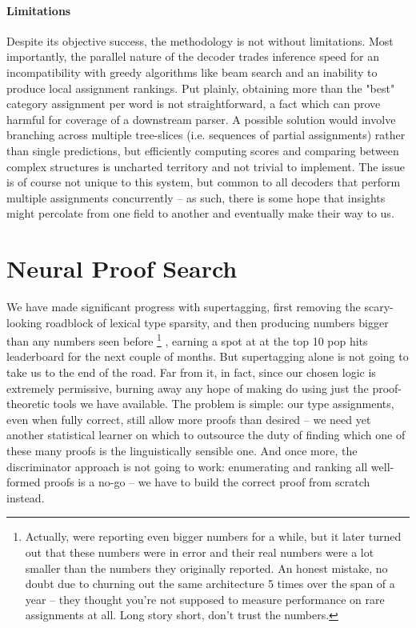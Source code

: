 \paragraph{Limitations}
Despite its objective success, the methodology is not without limitations.
Most importantly, the parallel nature of the decoder trades inference speed for an incompatibility with greedy algorithms like beam search and an inability to produce local assignment rankings.
Put plainly, obtaining more than the "best" category assignment per word is not straightforward, a fact which can prove harmful for coverage of a downstream parser.
A possible solution would involve branching across multiple tree-slices (i.e. sequences of partial assignments) rather than single predictions, but efficiently computing scores and comparing between complex structures is uncharted territory and not trivial to implement.
The issue is of course not unique to this system, but common to all decoders that perform multiple assignments concurrently -- as such, there is some hope that insights might percolate from one field to another and eventually make their way to us.

\section{Neural Proof Search}
\label{section:npn}
We have made significant progress with supertagging, first removing the scary-looking roadblock of lexical type sparsity, and then producing numbers bigger than any numbers seen before%
	\footnote{Actually, \citet{tian2020supertagging} were reporting even bigger numbers for a while, but it later turned out that these numbers were in error and their real numbers were a lot smaller than the numbers they originally reported.
	An honest mistake, no doubt due to churning out the same architecture 5 times over the span of a year -- they thought you're not supposed to measure performance on rare assignments at all.
	Long story short, don't trust the numbers.}%
, earning a spot at at the top 10 pop hits leaderboard for the next couple of months.
But supertagging alone is not going to take us to the end of the road.
Far from it, in fact, since our chosen logic is extremely permissive, burning away any hope of making do using just the proof-theoretic tools we have available.
The problem is simple: our type assignments, even when fully correct, still allow more proofs than desired -- we need yet another statistical learner on which to outsource the duty of finding which one of these many proofs is the linguistically sensible one.
And once more, the discriminator approach is not going to work: enumerating and ranking all well-formed proofs is a no-go -- we have to build the correct proof from scratch instead.

